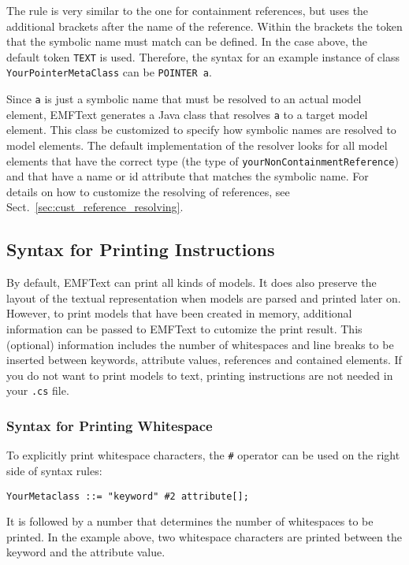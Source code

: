 The rule is very similar to the one for containment references, but uses the 
additional brackets after the name of the reference. Within the brackets 
the token that the symbolic name must match can be defined. In the case above,
the default token \texttt{TEXT} is used. Therefore, the syntax for an example
instance of class \texttt{YourPointerMetaClass} can be \texttt{POINTER a}.

Since \texttt{a} is just a symbolic name that must be resolved to an actual 
model element, EMFText generates a Java class that resolves \texttt{a} to a 
target model element. This class be customized to specify how symbolic names are
resolved to model elements. The default implementation of the resolver looks 
for all model elements that have the correct type (the type of
\texttt{yourNonContainmentReference}) and that have a
name or id attribute that matches the symbolic name. For details on how to
customize the resolving of references, see
Sect.~\ref{sec:cust_reference_resolving}.

\subsection{Syntax for Printing Instructions}

By default, EMFText can print all kinds of models. It does also preserve the
layout of the textual representation when models are parsed and printed later
on. However, to print models that have been created in memory, additional
information can be passed to EMFText to cutomize the print result. This
(optional) information includes the number of whitespaces and line breaks to be
inserted between keywords, attribute values, references and contained elements. 
If you do not want to print models to text, printing instructions are not needed 
in your \texttt{.cs} file.

\subsubsection{Syntax for Printing Whitespace}

To explicitly print whitespace characters, the \texttt{\#} operator can be used
on the right side of syntax rules:

\begin{lstlisting}
YourMetaclass ::= "keyword" #2 attribute[];
\end{lstlisting}

It is followed by a number that determines the number of whitespaces to be
printed. In the example above, two whitespace characters are printed between the
keyword and the attribute value.

